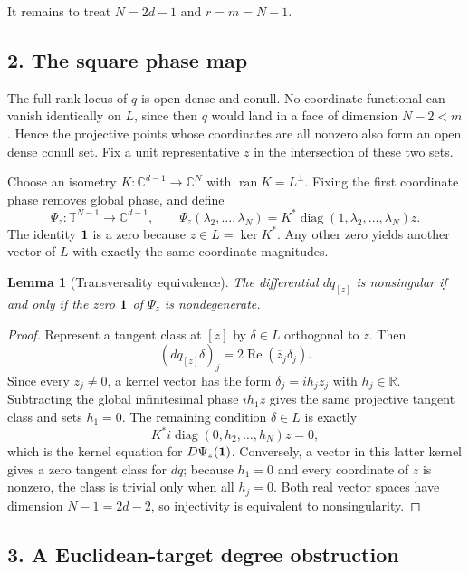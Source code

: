 \documentclass[10pt]{article}
\newtheorem{lemma}[theorem]{Lemma}
\newcommand{\T}{\mathbb T}
\newcommand{\C}{\mathbb C}
\newcommand{\ran}{\operatorname{ran}}
\newcommand{\diag}{\operatorname{diag}}
\begin{document}
It remains to treat \(N=2d-1\) and \(r=m=N-1\).

\subsection*{2. The square phase map}

The full-rank locus of \(q\) is open dense and conull.  No coordinate
functional can vanish identically on \(L\), since then \(q\) would land in a
face of dimension \(N-2<m\).  Hence the projective points whose coordinates
are all nonzero also form an open dense conull set.  Fix a unit representative
\(z\) in the intersection of these two sets.

Choose an isometry \(K:\C^{d-1}\to\C^N\) with
\(\ran K=L^\perp\).  Fixing the first coordinate phase removes global phase,
and define
\[
 \Psi_z:\T^{N-1}\longrightarrow\C^{d-1},\qquad
 \Psi_z(\lambda_2,\ldots,\lambda_N)
 =K^*\diag(1,\lambda_2,\ldots,\lambda_N)z.
\]
The identity \({\bf1}\) is a zero because \(z\in L=\ker K^*\).  Any other
zero yields another vector of \(L\) with exactly the same coordinate
magnitudes.

\begin{lemma}[Transversality equivalence]
\label{lem:transverse}
The differential \(dq_{[z]}\) is nonsingular if and only if the zero
\({\bf1}\) of \(\Psi_z\) is nondegenerate.
\end{lemma}

\begin{proof}
Represent a tangent class at \([z]\) by \(\delta\in L\) orthogonal to \(z\).
Then
\[
 (dq_{[z]}\delta)_j=2\operatorname{Re}(\overline z_j\delta_j).
\]
Since every \(z_j\ne0\), a kernel vector has the form
\(\delta_j=i h_jz_j\) with \(h_j\in\mathbb R\).  Subtracting the global
infinitesimal phase \(ih_1z\) gives the same projective tangent class and
sets \(h_1=0\).  The remaining condition \(\delta\in L\) is exactly
\[
 K^*i\diag(0,h_2,\ldots,h_N)z=0,
\]
which is the kernel equation for \(D\Psi_z({\bf1})\).  Conversely, a vector
in this latter kernel gives a zero tangent class for \(dq\); because
\(h_1=0\) and every coordinate of \(z\) is nonzero, the class is trivial only
when all \(h_j=0\).  Both real vector spaces have dimension \(N-1=2d-2\),
so injectivity is equivalent to nonsingularity.
\end{proof}

\subsection*{3. A Euclidean-target degree obstruction}
\end{document}
